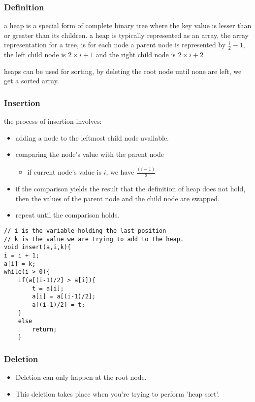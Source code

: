 \documentclass[11pt]{article}
\begin{document}
\subsubsection{Definition}
\label{sec:org65c9edd}
a heap is a special form of complete binary tree where the key value is lesser than or greater than its children.
a heap is typically represented as an array, the array representation for a tree, is for each node
a parent node is represented by \(\frac{i}{2} - 1\), the left child node is \(2\times i + 1\) and the right child node is \(2 \times i + 2\)

heaps can be used for sorting, by deleting the root node until none are left, we get a sorted array.
\subsubsection{Insertion}
\label{sec:org89840a4}
the process of insertion involves:
\begin{itemize}
\item adding a node to the leftmost child node available.
\item comparing the node's value with the parent node
\begin{itemize}
\item if current node's value is \(i\), we have \(\frac{(i-1)}{2}\)
\end{itemize}
\item if the comparison yields the result that the definition of heap does not hold, then the values of the parent node and the child node are swapped.
\item repeat until the comparison holds.
\end{itemize}

\begin{verbatim}
// i is the variable holding the last position
// k is the value we are trying to add to the heap.
void insert(a,i,k){
i = i + 1;
a[i] = k;
while(i > 0){
    if(a[(i-1)/2] > a[i]){
        t = a[i];
        a[i] = a[(i-1)/2];
        a[(i-1)/2] = t;
    }
    else
        return;
    }
\end{verbatim}
\subsubsection{Deletion}
\label{sec:orga785a8f}
\begin{itemize}
\item Deletion can only happen at the root node.
\item This deletion takes place when you're trying to perform 'heap sort'.
\end{itemize}
\end{document}
